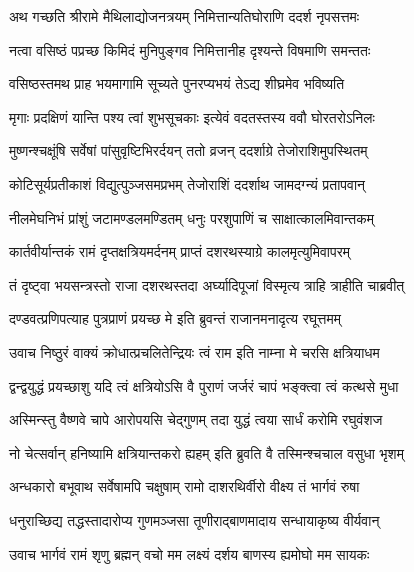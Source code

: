 

\twolineshloka
{अथ गच्छति श्रीरामे मैथिलाद्योजनत्रयम्}
{निमित्तान्यतिघोराणि ददर्श नृपसत्तमः} %

\twolineshloka
{नत्वा वसिष्ठं पप्रच्छ किमिदं मुनिपुङ्गव}
{निमित्तानीह दृश्यन्ते विषमाणि समन्ततः} %

\twolineshloka
{वसिष्ठस्तमथ प्राह भयमागामि सूच्यते}
{पुनरप्यभयं तेऽद्य शीघ्रमेव भविष्यति} %

\twolineshloka
{मृगाः प्रदक्षिणं यान्ति पश्य त्वां शुभसूचकाः}
{इत्येवं वदतस्तस्य ववौ घोरतरोऽनिलः} %

\twolineshloka
{मुष्णन्श्चक्षूंषि सर्वेषां पांसुवृष्टिभिरर्दयन्}
{ततो व्रजन् ददर्शाग्रे तेजोराशिमुपस्थितम्} %

\twolineshloka
{कोटिसूर्यप्रतीकाशं विद्युत्पुञ्जसमप्रभम्}
{तेजोराशिं ददर्शाथ जामदग्न्यं प्रतापवान्} %

\twolineshloka
{नीलमेघनिभं प्रांशुं जटामण्डलमण्डितम्}
{धनुः परशुपाणिं च साक्षात्कालमिवान्तकम्} %

\twolineshloka
{कार्तवीर्यान्तकं रामं दृप्तक्षत्रियमर्दनम्}
{प्राप्तं दशरथस्याग्रे कालमृत्युमिवापरम्} %

\twolineshloka
{तं दृष्ट्वा भयसन्त्रस्तो राजा दशरथस्तदा}
{अर्घ्यादिपूजां विस्मृत्य त्राहि त्राहीति चाब्रवीत्} %

\twolineshloka
{दण्डवत्प्रणिपत्याह पुत्रप्राणं प्रयच्छ मे}
{इति ब्रुवन्तं राजानमनादृत्य रघूत्तमम्} %

\twolineshloka
{उवाच निष्ठुरं वाक्यं क्रोधात्प्रचलितेन्द्रियः}
{त्वं राम इति नाम्ना मे चरसि क्षत्रियाधम} %

\twolineshloka
{द्वन्द्वयुद्धं प्रयच्छाशु यदि त्वं क्षत्रियोऽसि वै}
{पुराणं जर्जरं चापं भङ्क्त्वा त्वं कत्थसे मुधा} %

\twolineshloka
{अस्मिन्स्तु वैष्णवे चापे आरोपयसि चेद्गुणम्}
{तदा युद्धं त्वया सार्धं करोमि रघुवंशज} %

\twolineshloka
{नो चेत्सर्वान् हनिष्यामि क्षत्रियान्तकरो ह्यहम्}
{इति ब्रुवति वै तस्मिन्श्चचाल वसुधा भृशम्} %

\twolineshloka
{अन्धकारो बभूवाथ सर्वेषामपि चक्षुषाम्}
{रामो दाशरथिर्वीरो वीक्ष्य तं भार्गवं रुषा} %

\twolineshloka
{धनुराच्छिद्य तद्धस्तादारोप्य गुणमञ्जसा}
{तूणीराद्बाणमादाय सन्धायाकृष्य वीर्यवान्} %

\twolineshloka
{उवाच भार्गवं रामं शृणु ब्रह्मन् वचो मम}
{लक्ष्यं दर्शय बाणस्य ह्यमोघो मम सायकः} %

